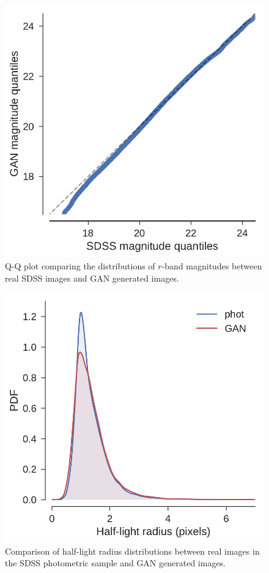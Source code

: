 \documentclass[fleqn,usenatbib]{mnras}
\begin{document}
\begin{figure}
  \centering
  \includegraphics[width=\columnwidth]{figures/mag_qq.pdf}
  \caption{Q-Q plot comparing the distributions of $r$-band magnitudes between real SDSS images and GAN generated images.}
  \label{fig:mag_qq}
\end{figure}

\begin{figure}
  \centering
  \includegraphics[width=\columnwidth]{figures/size_kde.pdf}
  \caption{Comparison of half-light radius distributions between real images in the SDSS photometric sample
  and GAN generated images.}
  \label{fig:size_kde}
\end{figure}
\end{document}
